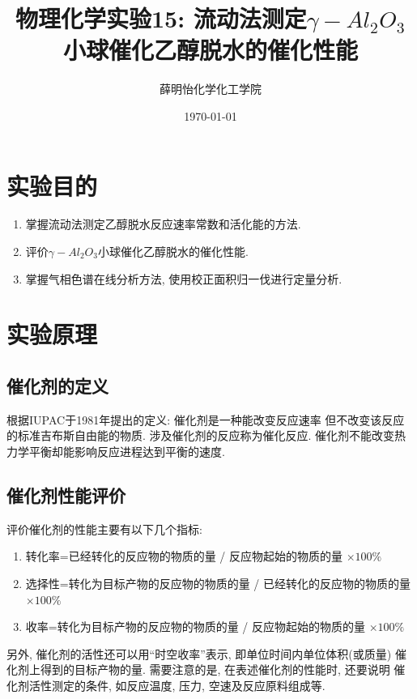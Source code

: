 \documentclass[a4paper]{article}
\title{物理化学实验15: 流动法测定$\gamma-Al_2O_3$小球催化乙醇脱水的催化性能}
\author{薛明怡\quad 151250177\quad 化学化工学院}
\date{\today}
\begin{document}
\maketitle
\section{实验目的}
\begin{enumerate}
\item 掌握流动法测定乙醇脱水反应速率常数和活化能的方法.
\item 评价$\gamma - Al_{2}O_{3}$小球催化乙醇脱水的催化性能.
\item 掌握气相色谱在线分析方法, 使用校正面积归一伐进行定量分析.
\end{enumerate}


\section{实验原理}
\subsection{催化剂的定义}
根据IUPAC于1981年提出的定义: 催化剂是一种能改变反应速率
但不改变该反应的标准吉布斯自由能的物质. 涉及催化剂的反应称为催化反应. 
催化剂不能改变热力学平衡却能影响反应进程达到平衡的速度.
\subsection{催化剂性能评价}
评价催化剂的性能主要有以下几个指标:
\begin{enumerate}
\item 转化率=已经转化的反应物的物质的量 / 反应物起始的物质的量 $\times 100\%$
\item 选择性=转化为目标产物的反应物的物质的量 / 已经转化的反应物的物质的量 $\times 100\%$
\item 收率=转化为目标产物的反应物的物质的量 / 反应物起始的物质的量 $\times 100\%$
\end{enumerate}
\par
另外, 催化剂的活性还可以用``时空收率''表示, 即单位时间内单位体积(或质量)
催化剂上得到的目标产物的量. 需要注意的是, 在表述催化剂的性能时, 还要说明
催化剂活性测定的条件, 如反应温度, 压力, 空速及反应原料组成等.
\end{document}
